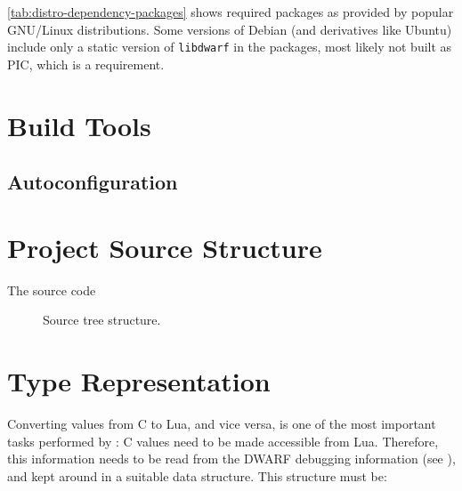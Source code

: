\autoref{tab:distro-dependency-packages} shows required packages as provided
by popular GNU/Linux distributions. Some versions of Debian (and derivatives
like Ubuntu) include only a static version of \verb|libdwarf| in the packages,
most likely not built as \gls{PIC}, which is a requirement.


\section{Build Tools}

\subsection{Autoconfiguration}
  \label{sec:running-configure}

\section{Project Source Structure}

The \Eris* source code

\begin{figure}[h]
    \centering
    \noindent\begin{minipage}{0.75\textwidth}
    \end{minipage}
    \caption{Source tree structure.}
\end{figure}



\section{Type Representation}

Converting values from C to Lua, and vice versa, is one of the most important
tasks performed by \Eris*: C values need to be made accessible from Lua.
Therefore, this information needs to be read from the DWARF debugging
information (see ), and kept around in
a suitable data structure. This structure must be:


